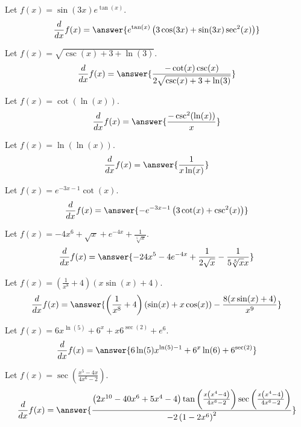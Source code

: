 \documentclass{ximera}
\begin{document}
\begin{shuffle}
\begin{exercise}
\begin{exercise}
Let $f(x)=\sin (3 x) e^{\tan (x)}$.
\[
\ddx f(x) = \answer{e^{\tan (x)} \left(3 \cos (3 x)+\sin (3 x) \sec ^2(x)\right)}
\]
\end{exercise}

\begin{exercise}
Let $f(x)=\sqrt{\csc (x)+3+\ln (3)}$.
\[
\ddx f(x) = \answer{\frac{-\cot (x) \csc (x)}{2 \sqrt{\csc (x)+3+\ln (3)}}}
\]
\end{exercise}

\begin{exercise}
Let $f(x)=\cot (\ln (x))$.
\[
\ddx f(x) = \answer{\frac{-\csc ^2(\ln (x))}{x}}
\]
\end{exercise}

\begin{exercise}
Let $f(x)=\ln (\ln (x))$.
\[
\ddx f(x) = \answer{\frac{1}{x \ln (x)}}
\]
\end{exercise}

\begin{exercise}
Let $f(x)=e^{-3 x-1} \cot (x)$.
\[
\ddx f(x) = \answer{-e^{-3 x-1} \left(3 \cot (x)+\csc ^2(x)\right)}
\]
\end{exercise}

\begin{exercise}
Let $f(x)=-4 x^6+\sqrt{x}+e^{-4 x}+\frac{1}{\sqrt[5]{x}}$.
\[
\ddx f(x) = \answer{-24 x^5-4 e^{-4 x}+\frac{1}{2 \sqrt{x}}-\frac{1}{5 \sqrt[5]{x} x}}
\]
\end{exercise}

\begin{exercise}
Let $f(x)=\left(\frac{1}{x^8}+4\right) (x \sin (x)+4)$.
\[
\ddx f(x) = \answer{\left(\frac{1}{x^8}+4\right) (\sin (x)+x \cos (x))-\frac{8 (x \sin (x)+4)}{x^9}}
\]
\end{exercise}

\begin{exercise}
Let $f(x)=6 x^{\ln (5)}+6^x+x 6^{\sec (2)}+e^6$.
\[
\ddx f(x) = \answer{6 \ln (5) x^{\ln (5)-1}+6^x \ln (6)+6^{\sec (2)}}
\]
\end{exercise}

\begin{exercise}
Let $f(x)=\sec \left(\frac{x^5-4 x}{4 x^6-2}\right)$.
\[
\ddx f(x) = \answer{\frac{\left(2 x^{10}-40 x^6+5 x^4-4\right) \tan \left(\frac{x \left(x^4-4\right)}{4 x^6-2}\right) \sec \left(\frac{x \left(x^4-4\right)}{4 x^6-2}\right)}{-2 \left(1-2 x^6\right)^2}}
\]
\end{exercise}


\end{exercise}
\end{shuffle}
\end{document}
